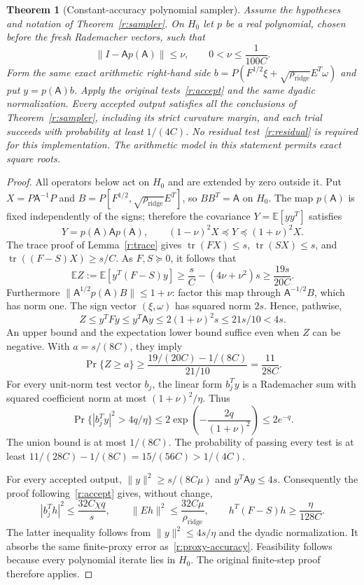 \documentclass[11pt]{amsart}
\newtheorem{theorem}{Theorem}[section]
\theoremstyle{definition}\newtheorem{definition}[theorem]{Definition}
\theoremstyle{remark}\newtheorem{remark}[theorem]{Remark}
\numberwithin{equation}{section}
\newcommand{\tr}{\operatorname{tr}}
\begin{document}
\begin{theorem}[Constant-accuracy polynomial sampler]\label{new:polysampler}
Assume the hypotheses and notation of Theorem~\ref{r:sampler}. On $H_0$
let $p$ be a real polynomial, chosen before the fresh Rademacher vectors,
such that
\begin{equation}\label{new:polycontract}
 \|I-\mathsf A p(\mathsf A)\|\le\nu,
 \qquad 0<\nu\le\frac1{100C}.
\end{equation}
Form the same exact arithmetic right-hand side
$b=P(F^{1/2}\xi+\sqrt{\rho_{\mathrm{ridge}}}E^T\omega)$ and put
$y=p(\mathsf A)b$. Apply the original tests~\eqref{r:accept} and the
same dyadic normalization. Every accepted output satisfies all the
conclusions of Theorem~\ref{r:sampler}, including its strict curvature
margin, and each trial succeeds with probability at least $1/(4C)$.
No residual test~\eqref{r:residual} is required for this implementation.
The arithmetic model in this statement permits exact square roots.
\end{theorem}
\begin{proof}
All operators below act on $H_0$ and are extended by zero outside it.
Put $X=P\mathsf A^{-1}P$ and
$B=P[F^{1/2},\sqrt{\rho_{\mathrm{ridge}}}E^T]$, so $BB^T=\mathsf A$
on $H_0$. The map $p(\mathsf A)$ is fixed independently of the signs;
therefore the covariance $Y=\mathbb E[yy^T]$ satisfies
\begin{equation}\label{new:polycov}
 Y=p(\mathsf A)\mathsf A p(\mathsf A),\qquad
 (1-\nu)^2X\preceq Y\preceq(1+\nu)^2X.
\end{equation}
The trace proof of Lemma~\ref{r:trace} gives
$\tr(FX)\le s$, $\tr(SX)\le s$, and
$\tr((F-S)X)\ge s/C$. As $F,S\succeq0$, it follows that
\[
 \mathbb E Z:=\mathbb E[y^T(F-S)y]
 \ge\frac{s}{C}-(4\nu+\nu^2)s\ge\frac{19s}{20C}.
\]
Furthermore $\|\mathsf A^{1/2}p(\mathsf A)B\|\le1+\nu$:
factor this map through $\mathsf A^{-1/2}B$, which has norm one.
The sign vector $(\xi,\omega)$ has squared norm $2s$. Hence, pathwise,
\[
 Z\le y^TFy\le y^T\mathsf Ay
 \le2(1+\nu)^2s\le21s/10<4s.
\]
An upper bound and the expectation lower bound suffice even when $Z$
can be negative. With $a=s/(8C)$, they imply
\[
 \Pr\{Z\ge a\}\ge
 \frac{19/(20C)-1/(8C)}{21/10}=\frac{11}{28C}.
\]
For every unit-norm test vector $b_j$, the linear form $b_j^Ty$ is a
Rademacher sum with squared coefficient norm at most
$(1+\nu)^2/\eta$. Thus
\[
 \Pr\{|b_j^Ty|^2>4q/\eta\}
 \le2\exp\!\left(-\frac{2q}{(1+\nu)^2}\right)\le2e^{-q}.
\]
The union bound is at most $1/(8C)$. The probability of passing every
test is at least $11/(28C)-1/(8C)=15/(56C)>1/(4C)$.

For every accepted output, $\|y\|^2\ge s/(8C\mu)$ and
$y^T\mathsf Ay\le4s$. Consequently the proof following~\eqref{r:accept}
gives, without change,
\[
 |b_j^Th|^2\le\frac{32C\chi q}{s},\qquad
 \|Eh\|^2\le\frac{32C\mu}{\rho_{\mathrm{ridge}}},\qquad
 h^T(F-S)h\ge\frac{\eta}{128C}.
\]
The latter inequality follows from $\|y\|^2\le4s/\eta$ and the
dyadic normalization. It absorbs the same finite-proxy error
as~\eqref{r:proxy-accuracy}. Feasibility follows because every polynomial
iterate lies in $H_0$. The original finite-step proof therefore applies.
\end{proof}
\end{document}
